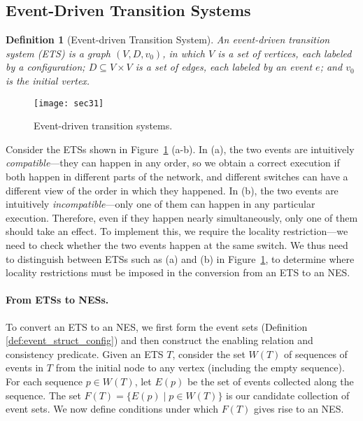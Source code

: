 \documentclass[pldi-cameraready]{sigplanconf}
\newtheorem{definition}{Definition}
\begin{document}
\subsection{Event-Driven Transition Systems}
\label{subsec:ets}
\begin{definition}[Event-driven Transition System]
An {\em event-driven transition system (ETS)} is a graph $(V,D,v_0)$,
in which $V$ is a set of vertices, each labeled by a
configuration; $D \subseteq V \times V$ is a
set of edges, each labeled by an event $e$; 
and $v_0$ is the initial vertex. 
\end{definition}

\begin{figure}[t]
\centering
\texttt{[image: sec31]}
\caption{Event-driven transition systems.}
\label{fig:ETSs}
\end{figure}


Consider the ETSs shown in Figure~\ref{fig:ETSs} (a-b). In (a), the
two events are intuitively {\em compatible}---they can happen in any order,
so we obtain a correct execution if both happen in different parts of
the network, and different switches can have a different view of the
order in which they happened. In (b), the two events are intuitively
{\em incompatible}---only one of them can happen in any particular
execution. Therefore, even if they happen nearly simultaneously, only
one of them should take an effect.
To implement this, we require the
locality restriction---we need to check whether the two events happen
at the same switch.
We thus need to distinguish between ETSs such as
(a) and (b) in Figure~\ref{fig:ETSs}, to determine where
locality restrictions must be imposed in the conversion from an ETS to
an NES.



\paragraph*{From ETSs to NESs.}
To convert an ETS to an NES, we first form the event sets
(Definition \ref{def:event_struct_config}) and then construct the enabling relation and consistency
predicate.
Given an ETS $T$, consider the
set $W(T)$ of sequences of events in $T$ from the initial node to any
vertex (including the empty sequence). For
each sequence $p \in W(T)$, let $E(p)$ be the set of events collected
along the sequence. The set $F(T) =\{ E(p) \mid p \in W(T) \}$ is our
candidate collection of event sets.
We now define conditions under which $F(T)$ gives rise to an NES.
\end{document}
